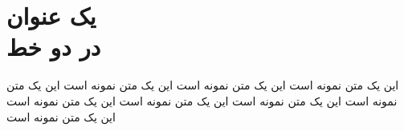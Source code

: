 \documentclass{article}
\begin{document}
\section{یک عنوان\\ در دو خط}
این یک متن نمونه است این یک متن نمونه است این یک متن نمونه است این یک متن نمونه است این یک متن نمونه است این یک متن نمونه است این یک متن نمونه است این یک متن نمونه است
\end{document}
